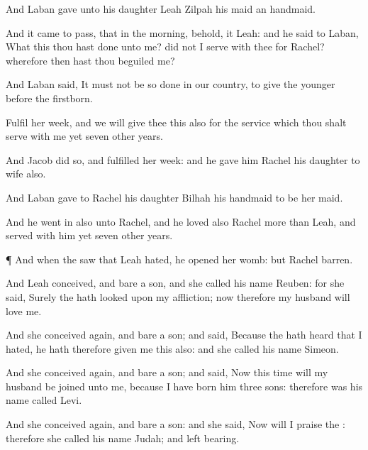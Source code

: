 {And
Laban
gave unto his
daughter
Leah
Zilpah his
maid
{} an
handmaid.

And it came to pass, that in the
morning, behold, it
{}
Leah: and he
said to
Laban, What
{} this thou hast
done unto me? did not I
serve with thee for
Rachel? wherefore then hast thou
beguiled me?

And
Laban
said, It must not be so
done in our
country, to
give the
younger
before the
firstborn.

Fulfil
her
week, and we will
give thee this also for the
service which thou shalt
serve with me yet
seven
other
years.

And
Jacob
did so, and
fulfilled her
week: and he
gave him
Rachel his
daughter to
wife also.

And
Laban
gave to
Rachel his
daughter
Bilhah his
handmaid to be her
maid.

And he went
in also unto
Rachel, and he
loved also
Rachel more than
Leah, and
served with him yet
seven
other
years.


\par }{\PP {}¶ And when the
{}
saw that
Leah
{}
hated, he
opened her
womb: but
Rachel
{}
barren.

And
Leah
conceived, and
bare a
son, and she
called his
name
Reuben:
for she
said,
Surely the
{} hath
looked upon my
affliction; now
therefore my
husband will
love me.

And she
conceived again, and
bare a
son; and
said, Because the
{} hath
heard that I
{}
hated, he hath therefore
given me this
{} also: and she
called his
name
Simeon.

And she conceived
again, and
bare a
son; and
said, Now this
time will my
husband be
joined unto me, because I have
born him
three
sons: therefore was his
name
called
Levi.

And she
conceived again, and
bare a
son: and she
said,
Now will I
praise the
{}: therefore she
called his
name
Judah; and
left
bearing.




\par }
